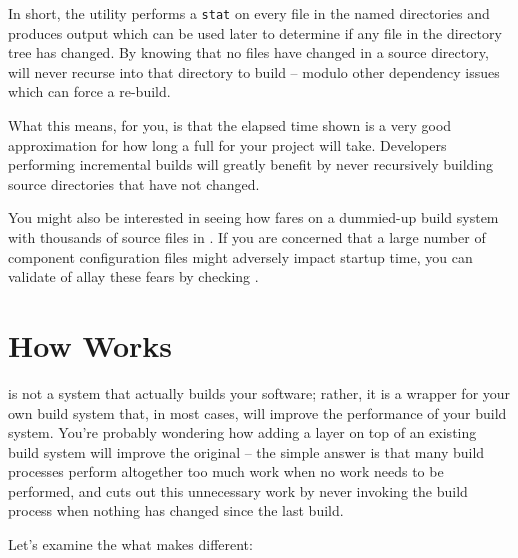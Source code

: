 In short, the \mtree utility performs a \texttt{stat} on every file in
the named directories and produces output which can be used later to
determine if any file in the directory tree has changed.  By knowing
that no files have changed in a source directory, \lmsbw will never
recurse into that directory to build -- modulo other dependency issues
which can force a re-build.

What this means, for you, is that the elapsed time shown is a very
good approximation for how long a full \nullbuild for your project
will take.  Developers performing incremental builds will greatly
benefit by never recursively building source directories that have not
changed.

You might also be interested in seeing how \lmsbw fares on a
dummied-up build system with thousands of source files in
.  If you are concerned that a large number of
component configuration files might adversely impact startup time, you
can validate of allay these fears by checking
.

\section{How \lmsbw Works}

\lmsbw is not a system that actually builds your software; rather, it
is a wrapper for your own build system that, in most cases, will
improve the performance of your build system.  You're probably
wondering how adding a layer on top of an existing build system will
improve the original -- the simple answer is that many build processes
perform altogether too much work when no work needs to be performed,
and \lmsbw cuts out this unnecessary work by never invoking the build
process when nothing has changed since the last build.

Let's examine the what makes \lmsbw different:

